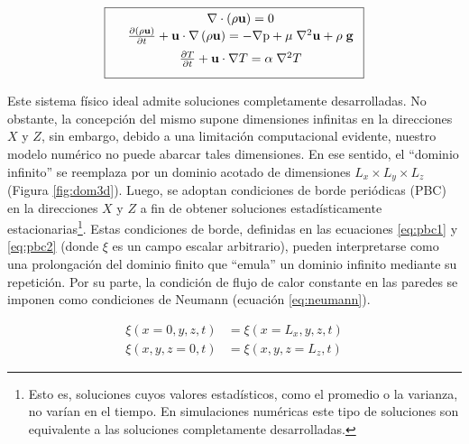 \begin{equation}
        \boxed{ \begin{array}{lcc}
              &  \nabla \cdot \left( \rho \mathbf{u} \right) = 0 \\
              \vspace*{2mm}
              &  \frac{\partial \left( \rho \mathbf{u} \right)}{\partial t} + \mathbf{u} \cdot \nabla  \left( \rho \mathbf{u} \right) = -\nabla \text{p} + \mu \hspace{1mm} {\nabla}^2 \mathbf{u}  + \rho \hspace{1mm} \mathbf{g} \\
              \vspace*{2mm}
              &  \frac{\partial T}{\partial t} + \mathbf{u} \cdot \nabla T =  \alpha \hspace{1mm} \nabla^2 T  \\
             \end{array}
               }
             \label{eq:gob_system}
\end{equation}

Este sistema físico ideal admite soluciones completamente desarrolladas. No obstante, la concepción del mismo supone dimensiones infinitas en la direcciones $X$ y $Z$, sin embargo, debido a una limitación computacional evidente, nuestro modelo numérico no puede abarcar tales dimensiones. En ese sentido, el ``dominio infinito'' se reemplaza por un dominio acotado de dimensiones $L_x \times L_y \times L_z$ (Figura \ref{fig:dom3d}). Luego, se adoptan condiciones de borde periódicas (PBC) en la direcciones $X$ y $Z$ a fin de obtener soluciones estadísticamente estacionarias\footnote{Esto es, soluciones cuyos valores estadísticos, como el promedio o la varianza, no varían en el tiempo. En simulaciones numéricas este tipo de soluciones son equivalente a las soluciones completamente desarrolladas.}. Estas condiciones de borde, definidas en las ecuaciones \ref{eq:pbc1} y \ref{eq:pbc2} (donde $\xi$ es un campo escalar arbitrario), pueden interpretarse como una prolongación del dominio finito que ``emula'' un dominio infinito mediante su repetición. Por su parte, la condición de flujo de calor constante en las paredes se imponen como condiciones de Neumann (ecuación \ref{eq:neumann}).

\begin{align}
\xi(x=0,y,z,t) &= \xi(x=L_x,y,z,t)
\label{eq:pbc1} \\
\xi(x,y,z=0,t) &= \xi(x,y,z=L_z,t)
\label{eq:pbc2}
\end{align}

